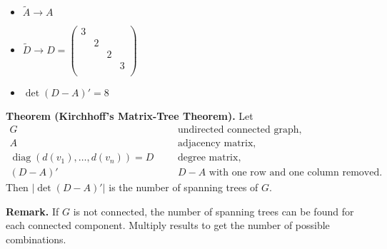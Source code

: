 \begin{itemize}
	\item $\tilde A \rightarrow A$
	\item $\tilde D \rightarrow D =
		\begin{pmatrix}3 \\ & 2 \\ & & 2 \\ & & & 3 \\ \end{pmatrix}$
	\item $\det{(D-A)'} = 8$
\end{itemize}

\textbf{Theorem (Kirchhoff's Matrix-Tree Theorem).}
Let
\begin{align*}
G &&& \text{undirected connected graph,} \\
A &&& \text{adjacency matrix,} \\
\operatorname{diag}(d(v_1),\ldots,d(v_n)) = D &&& \text{degree matrix,} \\
(D-A)' &&& \text{$D-A$ with one row and one column removed.}
\end{align*}
Then $|\det{(D-A)'}|$ is the number of spanning trees of $G$.

\textbf{Remark.} If $G$ is not connected, the number of spanning trees can be
found for each connected component. Multiply results to get the number
of possible combinations.







